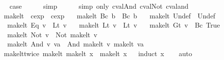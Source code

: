 \begin{isabellebody}
\ \isamarkupfalse%
\ {\isacharquery}case\isanewline
\ \ \ \ \isamarkupfalse%
\ simp\isanewline
\ \ \ \ \isamarkupfalse%
\ {\isacharparenleft}simp\ only{\isacharcolon}\ cval{\isacharunderscore}And\ cval{\isacharunderscore}Not\ cval{\isacharunderscore}and{\isacharparenright}\isanewline
{}\isamarkupfalse%
%
\endisatagproof
{\isafoldproof}%
%
\isadelimproof
\isanewline
%
\endisadelimproof
\isanewline
{}\isamarkupfalse%
\ make{\isacharunderscore}lt\ {\isacharcolon}{\isacharcolon}\ {\isachardoublequoteopen}cexp\ {\isasymRightarrow}\ cexp{\isachardoublequoteclose}\ \isanewline
\ \ {\isachardoublequoteopen}make{\isacharunderscore}lt\ {\isacharparenleft}Bc\ b{\isacharparenright}\ {\isacharequal}\ Bc\ b{\isachardoublequoteclose}\ {\isacharbar}\isanewline
\ \ {\isachardoublequoteopen}make{\isacharunderscore}lt\ Undef\ {\isacharequal}\ Undef{\isachardoublequoteclose}\ {\isacharbar}\isanewline
\ \ {\isachardoublequoteopen}make{\isacharunderscore}lt\ {\isacharparenleft}Eq\ v{\isacharparenright}\ {\isacharequal}\ Lt\ v{\isachardoublequoteclose}\ {\isacharbar}\isanewline
\ \ {\isachardoublequoteopen}make{\isacharunderscore}lt\ {\isacharparenleft}Lt\ v{\isacharparenright}\ {\isacharequal}\ Lt\ v{\isachardoublequoteclose}\ {\isacharbar}\isanewline
\ \ {\isachardoublequoteopen}make{\isacharunderscore}lt\ {\isacharparenleft}Gt\ v{\isacharparenright}\ {\isacharequal}\ Bc\ True{\isachardoublequoteclose}\ {\isacharbar}\isanewline
\ \ {\isachardoublequoteopen}make{\isacharunderscore}lt\ {\isacharparenleft}Not\ v{\isacharparenright}\ {\isacharequal}\ Not\ {\isacharparenleft}make{\isacharunderscore}lt\ v{\isacharparenright}{\isachardoublequoteclose}\ {\isacharbar}\isanewline
\ \ {\isachardoublequoteopen}make{\isacharunderscore}lt\ {\isacharparenleft}And\ v\ va{\isacharparenright}\ {\isacharequal}\ And\ {\isacharparenleft}make{\isacharunderscore}lt\ v{\isacharparenright}\ {\isacharparenleft}make{\isacharunderscore}lt\ va{\isacharparenright}{\isachardoublequoteclose}\isanewline
\isanewline
{}\isamarkupfalse%
\ make{\isacharunderscore}lt{\isacharunderscore}twice{\isacharcolon}\ {\isachardoublequoteopen}make{\isacharunderscore}lt\ {\isacharparenleft}make{\isacharunderscore}lt\ x{\isacharparenright}\ {\isacharequal}\ make{\isacharunderscore}lt\ x{\isachardoublequoteclose}\isanewline
%
\isadelimproof
\ \ %
\endisadelimproof
%
\isatagproof
{}\isamarkupfalse%
{\isacharparenleft}induct\ x{\isacharparenright}\isanewline
\ \ \isamarkupfalse%
\ auto%

\end{isabellebody}
